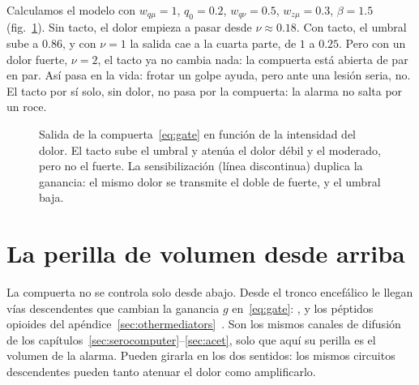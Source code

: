 Calculamos el modelo con $w_{q\mu}=1$, $q_0=0.2$, $w_{q\nu}=0.5$, $w_{z\mu}=0.3$, $\beta=1.5$ (fig.~\ref{fig:gatecurves}). Sin tacto, el dolor empieza a pasar desde $\nu\approx0.18$. Con tacto, el umbral sube a $0.86$, y con $\nu=1$ la salida cae a la cuarta parte, de $1$ a $0.25$. Pero con un dolor fuerte, $\nu=2$, el tacto ya no cambia nada: la compuerta está abierta de par en par. Así pasa en la vida: frotar un golpe ayuda, pero ante una lesión seria, no. El tacto por sí solo, sin dolor, no pasa por la compuerta: la alarma no salta por un roce.

\begin{figure}[t]
\centering
{}
\caption{Salida de la compuerta~\eqref{eq:gate} en función de la intensidad del dolor. El tacto sube el umbral y atenúa el dolor débil y el moderado, pero no el fuerte. La sensibilización (línea discontinua) duplica la ganancia: el mismo dolor se transmite el doble de fuerte, y el umbral baja.}
\label{fig:gatecurves}
\end{figure}

\section{La perilla de volumen desde arriba}

La compuerta no se controla solo desde abajo. Desde el tronco encefálico le llegan vías descendentes que cambian la ganancia $g$ en~\eqref{eq:gate}: ,  y los péptidos opioides del apéndice~\ref{sec:othermediators}~\cite{Fields2004}. Son los mismos canales de difusión de los capítulos~\ref{sec:serocomputer}--\ref{sec:acet}, solo que aquí su perilla es el volumen de la alarma. Pueden girarla en los dos sentidos: los mismos circuitos descendentes pueden tanto atenuar el dolor como amplificarlo.


